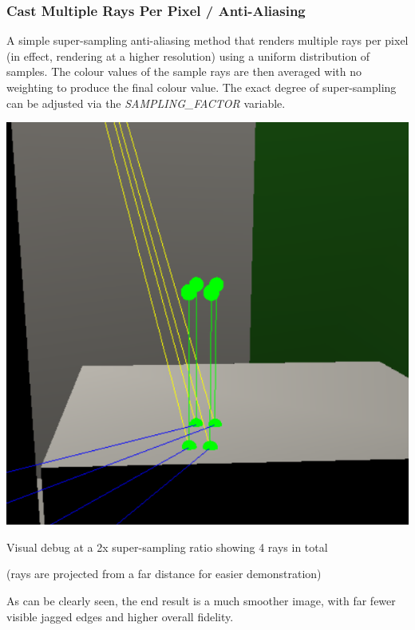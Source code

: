 \documentclass{article}
\begin{document}
    \subsubsection{Cast Multiple Rays Per Pixel / Anti-Aliasing}
    A simple super-sampling anti-aliasing method that renders multiple rays per pixel (in effect, rendering at a higher resolution) using a uniform distribution of samples.
    The colour values of the sample rays are then averaged with no weighting to produce the final colour value.
    The exact degree of super-sampling can be adjusted via the \emph{SAMPLING\_FACTOR} variable.

    \begin{center}
        \includegraphics[scale=0.75]{images/supersampling_debugger.png}

        {\footnotesize Visual debug at a 2x super-sampling ratio showing 4 rays in total
        
        (rays are projected from a far distance for easier demonstration)\par}
    \end{center}

    As can be clearly seen, the end result is a much smoother image,
    with far fewer visible jagged edges and higher overall fidelity.
\end{document}
